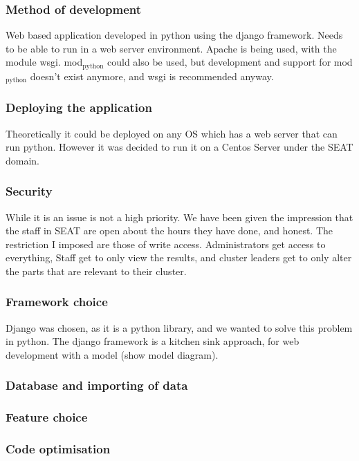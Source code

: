 \documentclass[11pt]{article}
\begin{document}
\subsubsection{Method of development}
\label{sec-2_3_1}

Web based application developed in python using the django framework.
Needs to be able to run in a web server environment.  Apache is being
used, with the module wsgi. mod$_{\mathrm{python}}$ could also be used, but
development and support for mod$_{\mathrm{python}}$ doesn't exist anymore, and wsgi
is recommended anyway.
\subsubsection{Deploying the application}
\label{sec-2_3_2}

Theoretically it could be deployed on any OS which has a web server
that can run python. However it was decided to run it on a Centos
Server under the SEAT domain.
\subsubsection{Security}
\label{sec-2_3_3}

While it is an issue is not a high priority.  We have been
given the impression that the staff in SEAT are open about the hours
they have done, and honest.  The restriction I imposed are those of
write access.  Administrators get access to everything, Staff get to
only view the results, and cluster leaders get to only alter the parts
that are relevant to their cluster.
\subsubsection{Framework choice}
\label{sec-2_3_4}

Django was chosen, as it is a python library, and we wanted to solve
this problem in python.  The django framework is a kitchen sink
approach, for web development with a model (show model diagram).
\subsubsection{Database and importing of data}
\label{sec-2_3_5}
\subsubsection{Feature choice}
\label{sec-2_3_6}
\subsubsection{Code optimisation}
\label{sec-2_3_7}
\end{document}

